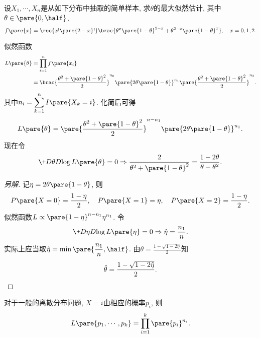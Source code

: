\documentclass[../Statistics.tex]{subfiles}
\begin{document}
\begin{sample}
    \begin{ex}
        设$X_1,\cdots,X_n$是从如下分布中抽取的简单样本, 求$\theta$的最大似然估计, 其中$\displaystyle \theta\in\pare{0,\half}$.
        \[ f\pare{x} = \rec{x!\pare{2-x}!} \brac{\theta^x \pare{1-\theta}^{2-x} + \theta^{2-x}\pare{1-\theta}^x},\quad x=0,1,2. \]
    \end{ex}
    \begin{solution}
        似然函数
        \begin{align*}
            L\pare{\theta} &= \prod_{i=1}^n f\pare{x_i} \\
            &= \brac{\frac{\theta^2 + \pare{1-\theta}^2}{2}}^{n_0} \pare{2\theta\pare{1-\theta}}^{n_1}\pare{\frac{\theta^2 + \pare{1-\theta}^2}{2}}^{n_2}.
        \end{align*}
        其中$n_i = \displaystyle \sum_{k=1}^n I\pare{X_k=i}$. 化简后可得
        \[ L\pare{\theta} = \pare{\frac{\theta^2 + \pare{1-\theta}^2}{2}}^{n-n_1} \pare{2\theta\pare{1-\theta}}^{n_1}. \]
        现在令
        \[ \+D{\theta}D{\log L\pare{\theta}} = 0 \Rightarrow \frac{2}{\theta^2 + \pare{1-\theta}^2} = \frac{1-2\theta}{\theta-\theta^2}. \]
    \end{solution}
    \begin{proof}[另解]
        记$\eta = 2\theta\pare{1-\theta}$, 则
        \[ P\pare{X=0} = \frac{1-\eta}{2},\quad P\pare{X=1} = \eta,\quad P\pare{X=2} = \frac{1-\eta}{2}. \]
        似然函数$L \propto \pare{1-\eta}^{n-n_1}\eta^{n_1}$. 令
        \[ \+D{\eta}D{\log L\pare{\eta}} = 0 \Rightarrow \hat{\eta} = \frac{n_1}{n}. \]
        实际上应当取$\hat\eta = \displaystyle \min\pare{\frac{n_1}{n}, \half}$. 由$\theta = \frac{1-\sqrt{1-2\eta}}{2}$知
        \[ \hat\theta = \frac{1-\sqrt{1-2\hat\eta}}{2}. \qedhere \]
    \end{proof}
\end{sample}
\begin{remark}
    对于一般的离散分布问题, $X = i$由相应的概率$p_i$, 则
    \[ L\pare{p_1,\cdots,p_k} = \prod_{i=1}^k \pare{p_i}^{n_i}. \]
\end{remark}
\end{document}

